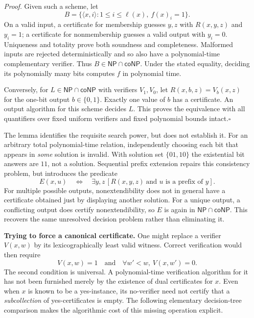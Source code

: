 \documentclass[11pt,a4paper]{article}
\numberwithin{equation}{section}
\begin{document}
\emph{Proof.} Given such a scheme, let
\[
 B=\{\langle x,i\rangle:1\le i\le\ell(x),\ f(x)_i=1\}.
\]
On a valid input, a certificate for membership guesses $y,z$ with
$R(x,y,z)$ and $y_i=1$; a certificate for nonmembership guesses a valid
output with $y_i=0$. Uniqueness and totality prove both soundness and
completeness. Malformed inputs are rejected deterministically and so also
have a polynomial-time complementary verifier. Thus
$B\in\mathsf{NP}\cap\mathsf{coNP}$. Under the stated equality, deciding
its polynomially many bits computes $f$ in polynomial time.

Conversely, for $L\in\mathsf{NP}\cap\mathsf{coNP}$ with verifiers $V_1,V_0$,
let $R(x,b,z)=V_b(x,z)$ for the one-bit output $b\in\{0,1\}$. Exactly one
value of $b$ has a certificate. An output algorithm for this scheme decides
$L$. This proves the equivalence with all quantifiers over fixed uniform
verifiers and fixed polynomial bounds intact.\hfill$\square$

The lemma identifies the requisite search power, but does not establish it.
For an arbitrary total polynomial-time relation, independently choosing each
bit that appears in \emph{some} solution is invalid. With solution set
$\{01,10\}$ the existential bit answers are $11$, not a solution. Sequential
prefix extension repairs this consistency problem, but introduces the
predicate
\begin{equation}\label{r34:prefix}
 E(x,u)\quad\Longleftrightarrow\quad
 \exists y,z\,[R(x,y,z)\ \text{and }u\text{ is a prefix of }y].
\end{equation}
For multiple possible outputs, nonextendibility does not in general have a
certificate obtained just by displaying another solution. For a unique output,
a conflicting output does certify nonextendibility, so $E$ is again in
$\mathsf{NP}\cap\mathsf{coNP}$. This recovers the same unresolved decision
problem rather than eliminating it.

\medskip
\textbf{Trying to force a canonical certificate.}
One might replace a verifier $V(x,w)$ by its lexicographically least valid
witness. Correct verification would then require
\[
 V(x,w)=1\quad\text{and}\quad
              \forall w'<w,\ V(x,w')=0.
\]
The second condition is universal. A polynomial-time verification algorithm
for it has not been furnished merely by the existence of dual certificates
for $x$. Even when $x$ is known to be a yes-instance, its no-verifier need
not certify that a \emph{subcollection} of yes-certificates is empty.
The following elementary decision-tree comparison makes the algorithmic
cost of this missing operation explicit.
\end{document}
